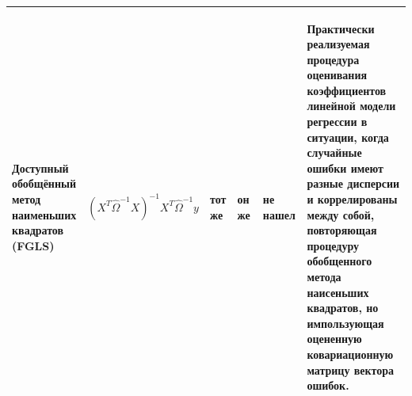 \documentclass[10pt,a4paper]{article}
\begin{document}
\begin{table}[h!]
\begin{center}
{\begin{tabular}{| p{0.13\linewidth} | p{0.18\linewidth}| p{0.07\linewidth} | p{0.1\linewidth} |p{0.12\linewidth} |p{0.4\linewidth} |}
\begin{center}Доступный обобщённый метод наименьших квадратов \newline (FGLS)\end{center} & \begin{center} \[(X^T \hat{\Omega}^{-1} X)^{-1}X^T \hat{\Omega}^{-1} y\]\end{center}& \begin{center}тот же  \end{center}& \begin{center} он же \end{center} & \begin{center}не нашел  \end{center}& \begin{center}Практически реализуемая процедура оценивания коэффициентов линейной модели регрессии в ситуации, когда случайные ошибки имеют разные дисперсии и коррелированы между собой, повторяющая процедуру обобщенного метода наисеньших квадратов, но импользующая оцененную ковариационную матрицу вектора ошибок.\end{center} \\
\hline

\end{tabular}}
\end{center}
\end{table}
\end{document}
